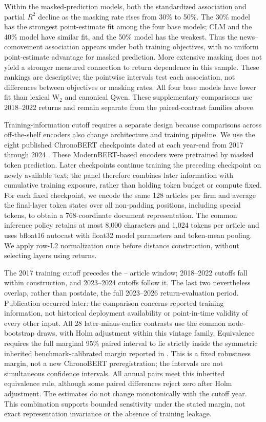 Within the masked-prediction models, both the standardized association and
partial $R^2$ decline as the masking rate rises from 30\% to 50\%.
The 30\% model has the strongest point-estimate fit among the four base
models; CLM and the 40\% model have similar fit, and the 50\% model has the weakest.
Thus the news--comovement association appears under both training objectives,
with no uniform point-estimate advantage for masked prediction.
More extensive masking does not yield a stronger measured connection to
return dependence in this sample.
These rankings are descriptive; the pointwise intervals test each association,
not differences between objectives or masking rates.
All four base models have lower fit than lexical W$_2$ and canonical Qwen.
These supplementary comparisons use 2018--2022 returns and remain separate
from the paired-contrast families above.

Training-information cutoff requires a separate design because comparisons
across off-the-shelf encoders also change architecture and training pipeline.
We use the eight published ChronoBERT checkpoints dated at each year-end from
2017 through 2024 \citep{he_chronobert_2025}.
These ModernBERT-based encoders were pretrained by masked token prediction.
Later checkpoints continue training the preceding checkpoint on newly
available text; the panel therefore combines later information with cumulative
training exposure, rather than holding token budget or compute fixed.
For each fixed checkpoint, we encode the same 128 articles per firm and average
the final-layer token states over all non-padding positions, including special
tokens, to obtain a 768-coordinate document representation.
The common inference policy retains at most 8,000 characters and 1,024 tokens
per article and uses bfloat16 autocast with float32 model parameters and
token-mean pooling.
We apply row-L2 normalization once before distance construction, without
selecting layers using returns.

The 2017 training cutoff precedes the
-- article window;
2018--2022 cutoffs fall within construction, and 2023--2024 cutoffs follow it.
The last two nevertheless overlap, rather than postdate, the full 2023--2026
return-evaluation period.
Publication occurred later: the comparison concerns reported training
information, not historical deployment availability or point-in-time validity
of every other input.
All 28 later-minus-earlier contrasts use the common node-bootstrap draws, with
Holm adjustment within this vintage family.
Equivalence requires the full marginal 95\% paired interval to lie strictly
inside the symmetric inherited benchmark-calibrated margin reported in
.
This is a fixed robustness margin, not a new ChronoBERT preregistration;
the intervals are not simultaneous confidence intervals.
All annual pairs meet this inherited equivalence rule, although some paired
differences reject zero after Holm adjustment.
The estimates do not change monotonically with the cutoff year.
This combination supports bounded sensitivity under the stated margin,
not exact representation invariance or the absence of training leakage.

